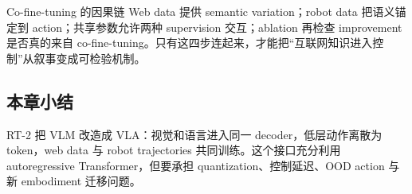 
\begin{importantbox}{Co-fine-tuning 的因果链}
Web data 提供 semantic variation；robot data 把语义锚定到 action；共享参数允许两种 supervision 交互；ablation 再检查 improvement 是否真的来自 co-fine-tuning。只有这四步连起来，才能把“互联网知识进入控制”从叙事变成可检验机制。
\end{importantbox}

\subsection{本章小结}

RT-2 把 VLM 改造成 VLA：视觉和语言进入同一 decoder，低层动作离散为 token，web data 与 robot trajectories 共同训练。这个接口充分利用 autoregressive Transformer，但要承担 quantization、控制延迟、OOD action 与新 embodiment 迁移问题。


